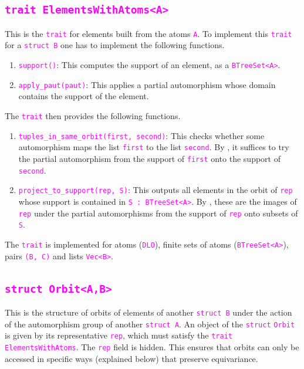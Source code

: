 \documentclass[12pt,a4paper,article]{memoir}
\newcommand{\code}[1]{\texttt{\textcolor{magenta}{#1}}}
\theoremstyle{definition}
\begin{document}
\subsection{\code{trait ElementsWithAtoms<A>}}
%
This is the \code{trait} for elements built from the atoms \code{A}.
To implement this \code{trait} for a \code{struct B} one has to implement the following functions.
\begin{enumerate}
\item \code{support()}: This computes the support of an element, as a \code{BTreeSet<A>}.
\item \code{apply\_paut(paut)}: This applies a partial automorphism whose domain contains the support of the element.
\end{enumerate}
The \code{trait} then provides the following functions.
\begin{enumerate}
\item \code{tuples\_in\_same\_orbit(first, second)}: This checks whether some automorphism maps the list \code{first} to the list \code{second}.
By , it suffices to try the partial automorphism from the support of \code{first} onto the support of \code{second}.
\item \code{project\_to\_support(rep, S)}: This outputs all elements in the orbit of \code{rep} whose support is contained in \code{S : BTreeSet<A>}.
By , these are the images of \code{rep} under the partial automorphisms from the support of \code{rep} onto subsets of \code{S}.
\end{enumerate}
The \code{trait} is implemented for atoms (\code{DLO}), finite sets of atoms (\code{BTreeSet<A>}),
pairs \code{(B, C)} and lists \code{Vec<B>}.
%
\subsection{\code{struct Orbit<A,B>}}
%
This is the structure of orbits of elements of another \code{struct B} under the action of the automorphism group of another \code{struct A}.
An object of the \code{struct} \code{Orbit} is given by its representative \code{rep},
which must satisfy the \code{trait} \code{ElementsWithAtoms}.
The \code{rep} field is hidden.
This ensures that orbits can only be accessed in specific ways (explained below) that preserve equivariance.
\end{document}
